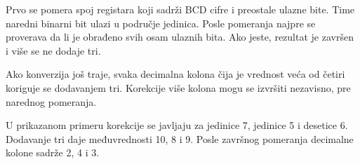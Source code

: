 Prvo se pomera spoj registara koji sadrži BCD cifre i preostale ulazne bite. Time naredni binarni bit ulazi u područje jedinica. Posle pomeranja najpre se proverava da li je obrađeno svih osam ulaznih bita. Ako jeste, rezultat je završen i više se ne dodaje tri.

Ako konverzija još traje, svaka decimalna kolona čija je vrednost veća od četiri koriguje se dodavanjem tri. Korekcije više kolona mogu se izvršiti nezavisno, pre narednog pomeranja.

U prikazanom primeru korekcije se javljaju za jedinice 7, jedinice 5 i desetice 6. Dodavanje tri daje međuvrednosti 10, 8 i 9. Posle završnog pomeranja decimalne kolone sadrže 2, 4 i 3.
